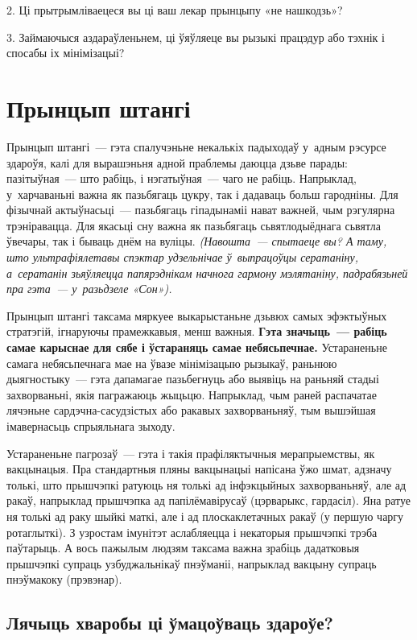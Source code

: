 2. Ці прытрымліваецеся вы ці ваш лекар прынцыпу «не нашкодзь»?

3. Займаючыся аздараўленьнем, ці ўяўляеце вы рызыкі працэдур або тэхнік і спосабы іх мінімізацыі?


\section{Прынцып штангі}

Прынцып штангі~--- гэта спалучэньне некалькіх падыходаў у~адным рэсурсе здароўя, калі для вырашэньня адной праблемы даюцца дзьве парады: пазітыўная~--- што рабіць, і нэгатыўная~--- чаго не рабіць. Напрыклад, у~харчаваньні важна як пазьбягаць цукру, так і дадаваць больш гародніны. Для фізычнай актыўнасьці~--- пазьбягаць гіпадынаміі нават важней, чым рэгулярна трэніравацца. Для якасьці сну важна як пазьбягаць сьвятлодыёднага сьвятла ўвечары, так і бываць днём на вуліцы. \emph{(Навошта~--- спытаеце вы? А таму, што ультрафіялетавы спэктар удзельнічае ў~выпрацоўцы сератаніну, а~сератанін зьяўляецца папярэднікам начнога гармону мэлятаніну, падрабязьней пра гэта~--- у~разьдзеле «Сон»).}

Прынцып штангі таксама мяркуее выкарыстаньне дзьвюх самых эфэктыўных стратэгій, ігнаруючы прамежкавыя, менш важныя. \textbf{Гэта значыць~--- рабіць самае карыснае для сябе і ўстараняць самае небясьпечнае.} Устараненьне самага небясьпечнага мае на ўвазе мінімізацыю рызыкаў, раньнюю дыягностыку~--- гэта дапамагае пазьбегнуць або выявіць на раньняй стадыі захворваньні, якія пагражаюць жыцьцю. Напрыклад, чым раней распачатае лячэньне сардэчна-сасудзістых або ракавых захворваньняў, тым вышэйшая імавернасьць спрыяльнага зыходу.

Устараненьне пагрозаў~--- гэта і такія прафіляктычныя мерапрыемствы, як вакцынацыя. Пра стандартныя пляны вакцынацыі напісана ўжо шмат, адзначу толькі, што прышчэпкі ратуюць ня толькі ад інфэкцыйных захворваньняў, але ад ракаў, напрыклад прышчэпка ад папілёмавірусаў (цэрварыкс, гардасіл). Яна ратуе ня толькі ад раку шыйкі маткі, але і ад плоскаклетачных ракаў (у першую чаргу ротаглыткі). З узростам імунітэт аслабляецца і некаторыя прышчэпкі трэба паўтарыць. А вось пажылым людзям таксама важна зрабіць дадатковыя прышчэпкі супраць узбуджальнікаў пнэўманіі, напрыклад вакцыну супраць пнэўмакоку (прэвэнар).

\subsection*{Лячыць хваробы ці ўмацоўваць здароўе?}

